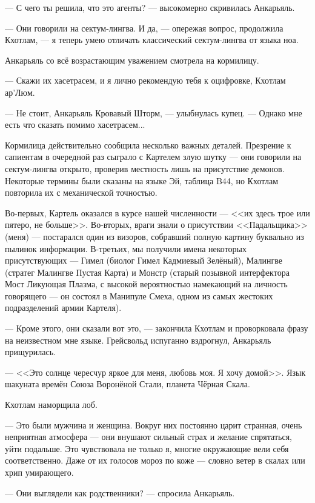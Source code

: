 --- С чего ты решила, что это агенты? --- высокомерно скривилась Анкарьяль.

--- Они говорили на сектум-лингва.
И да, --- опережая вопрос, продолжила Кхотлам, --- я теперь умею отличать классический сектум-лингва от языка ноа.

Анкарьяль со всё возрастающим уважением смотрела на кормилицу.

--- Скажи их хасетрасем, и я лично рекомендую тебя к оцифровке, Кхотлам ар'Люм.

--- Не стоит, Анкарьяль Кровавый Шторм, --- улыбнулась купец.
--- Однако мне есть что сказать помимо хасетрасем...

\asterism

Кормилица действительно сообщила несколько важных деталей.
Презрение к сапиентам в очередной раз сыграло с Картелем злую шутку --- они говорили на сектум-лингва открыто, проверив местность лишь на присутствие демонов.
Некоторые термины были сказаны на языке Эй, таблица B44, но Кхотлам повторила их с механической точностью.

Во-первых, Картель оказался в курсе нашей численности --- <<их здесь трое или пятеро, не больше>>.
Во-вторых, враги знали о присутствии <<Падальщика>> (меня) --- постарался один из визоров, собравший полную картину буквально из пылинок информации.
В-третьих, мы получили имена некоторых присутствующих --- Гимел (биолог Гимел Кадмиевый Зелёный), Малингве (стратег Малингве Пустая Карта) и Монстр (старый позывной интерфектора Мост Ликующая Плазма, с высокой вероятностью намекающий на личность говорящего --- он состоял в Манипуле Смеха, одном из самых жестоких подразделений армии Картеля).

--- Кроме этого, они сказали вот это, --- закончила Кхотлам и проворковала фразу на неизвестном мне языке.
Грейсвольд испуганно вздрогнул, Анкарьяль прищурилась.

--- <<Это солнце чересчур яркое для меня, любовь моя.
Я хочу домой>>.
Язык шакуната времён Союза Воронёной Стали, планета Чёрная Скала.

Кхотлам наморщила лоб.

--- Это были мужчина и женщина.
Вокруг них постоянно царит странная, очень неприятная атмосфера --- они внушают сильный страх и желание спрятаться, уйти подальше.
Это чувствовала не только я, многие окружающие вели себя соответственно.
Даже от их голосов мороз по коже --- словно ветер в скалах или хрип умирающего.

--- Они выглядели как родственники? --- спросила Анкарьяль.

